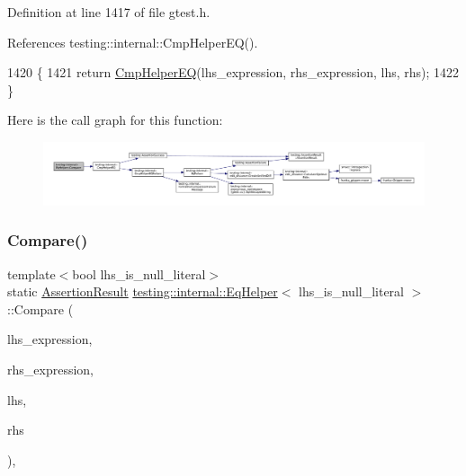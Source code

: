 Definition at line 1417 of file gtest.\+h.



References testing\+::internal\+::\+Cmp\+Helper\+E\+Q().


\begin{DoxyCode}
1420                                                 \{
1421     \textcolor{keywordflow}{return} \hyperlink{namespacetesting_1_1internal_a4638c74d9b32e971f9b321af6fafc2f1}{CmpHelperEQ}(lhs\_expression, rhs\_expression, lhs, rhs);
1422   \}
\end{DoxyCode}
Here is the call graph for this function\+:
\nopagebreak
\begin{figure}[H]
\begin{center}
\leavevmode
\includegraphics[width=350pt]{classtesting_1_1internal_1_1EqHelper_ae3572c7374534a916b9117efaa89f33f_cgraph}
\end{center}
\end{figure}
\mbox{\label{classtesting_1_1internal_1_1EqHelper_aaa42c0059bb3dcc43d556243febb5f1c}} 
\subsubsection{\texorpdfstring{Compare()}{Compare()}\hspace{0.1cm}{\footnotesize\ttfamily [2/2]}}
{\footnotesize\ttfamily template$<$bool lhs\+\_\+is\+\_\+null\+\_\+literal$>$ \\
static \hyperlink{classtesting_1_1AssertionResult}{Assertion\+Result} \hyperlink{classtesting_1_1internal_1_1EqHelper}{testing\+::internal\+::\+Eq\+Helper}$<$ lhs\+\_\+is\+\_\+null\+\_\+literal $>$\+::Compare (\begin{DoxyParamCaption}\item[{const char $\ast$}]{lhs\+\_\+expression,  }\item[{const char $\ast$}]{rhs\+\_\+expression,  }\item[{\hyperlink{namespacetesting_1_1internal_a05c6bd9ede5ccdf25191a590d610dcc6}{Biggest\+Int}}]{lhs,  }\item[{\hyperlink{namespacetesting_1_1internal_a05c6bd9ede5ccdf25191a590d610dcc6}{Biggest\+Int}}]{rhs }\end{DoxyParamCaption})\hspace{0.3cm}{\ttfamily [inline]}, {\ttfamily [static]}}



